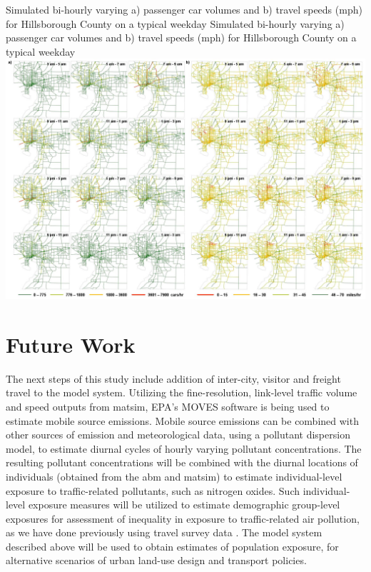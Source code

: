 \createfigure%
{Simulated bi-hourly varying a) passenger car volumes and b) travel speeds (mph) for Hillsborough County on a typical weekday}%
{Simulated bi-hourly varying a) passenger car volumes and b) travel speeds (mph) for Hillsborough County on a typical weekday}%
{\label{fig:tampa-fig3}}%
{\includegraphics[width=1.5\textwidth, angle=90]{./scenarios/figures/tampa-fig3.jpg}}%
{}

\section{Future Work}
The next steps of this study include addition of inter-city, visitor and freight travel to the model system. 
Utilizing the fine-resolution, link-level traffic volume and speed outputs from \gls{matsim}, EPA’s MOVES software is being used to estimate mobile source emissions. 
Mobile source emissions can be combined with other sources of emission and meteorological data, using a pollutant dispersion model, to estimate diurnal cycles of hourly varying pollutant concentrations. 
The resulting pollutant concentrations will be combined with the diurnal locations of individuals (obtained from the \gls{abm} and \gls{matsim}) to estimate individual-level exposure to traffic-related pollutants, such as nitrogen oxides. 
Such individual-level exposure measures will be utilized to estimate demographic group-level exposures for assessment of inequality in exposure to traffic-related air pollution, as we have done previously using travel survey data \citep[][]{GurramEtAl_AQAH_2015}. 
The model system described above will be used to obtain estimates of population exposure, for alternative scenarios of urban land-use design and transport policies.

